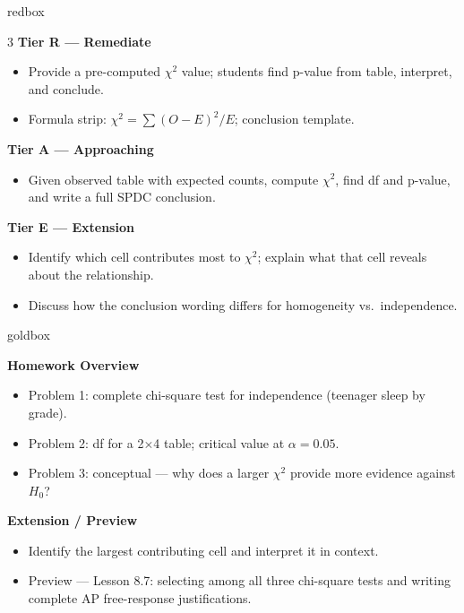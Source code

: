 \documentclass[10pt]{article}
\begin{document}
\begin{skillbox}{redbox}
\begin{multicols}{3}
    \textbf{Tier R --- Remediate}
    \begin{itemize}
        \item Provide a pre-computed $\chi^2$ value; students find p-value from table, interpret, and conclude.
        \item Formula strip: $\chi^2 = \sum(O-E)^2/E$; conclusion template.
    \end{itemize}
    \columnbreak
    \textbf{Tier A --- Approaching}
    \begin{itemize}
        \item Given observed table with expected counts, compute $\chi^2$, find df and p-value, and write a full SPDC conclusion.
    \end{itemize}
    \columnbreak
    \textbf{Tier E --- Extension}
    \begin{itemize}
        \item Identify which cell contributes most to $\chi^2$; explain what that cell reveals about the relationship.
        \item Discuss how the conclusion wording differs for homogeneity vs.\ independence.
    \end{itemize}
\end{multicols}
\end{skillbox}

\begin{skillbox}{goldbox}
\begin{minipage}[t]{0.48\linewidth}
    \textbf{Homework Overview}
    \begin{itemize}
        \item Problem 1: complete chi-square test for independence (teenager sleep by grade).
        \item Problem 2: df for a 2$\times$4 table; critical value at $\alpha = 0.05$.
        \item Problem 3: conceptual --- why does a larger $\chi^2$ provide more evidence against $H_0$?
    \end{itemize}
\end{minipage}
\hfill
\begin{minipage}[t]{0.48\linewidth}
    \textbf{Extension / Preview}
    \begin{itemize}
        \item Identify the largest contributing cell and interpret it in context.
        \item Preview --- Lesson 8.7: selecting among all three chi-square tests and writing complete AP free-response justifications.
    \end{itemize}
\end{minipage}
\end{skillbox}
\end{document}
